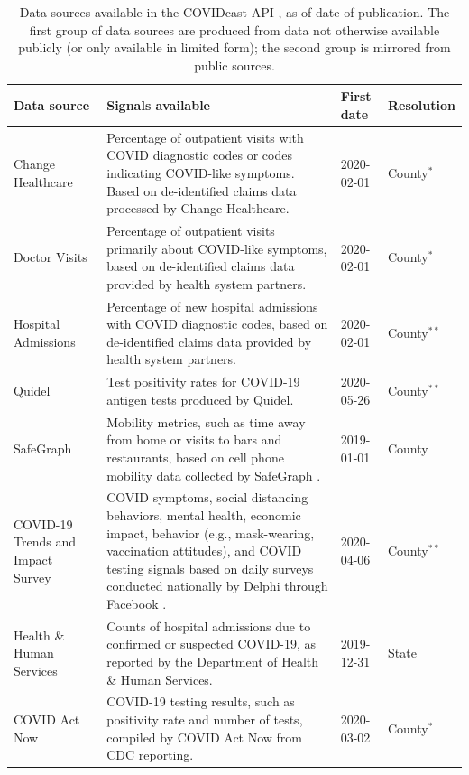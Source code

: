 \documentclass[9pt,twocolumn,twoside,lineno]{pnas-new}
\begin{document}
\begin{table}[t]
\centering
\caption{Data sources available in the COVIDcast API \cite{CovidcastAPI}, as of
  date of publication. The first group of data sources are produced from data
  not otherwise available publicly (or only available in limited form); the
  second group is mirrored from public sources.}
\begin{tabular}{>{\raggedright}p{1.2in} p{4.0in} l >{\raggedright\arraybackslash}p{0.5in}}
  \toprule
  \textbf{Data source} & \textbf{Signals available} & \textbf{First date} &
\textbf{Resolution} \\\midrule
  Change Healthcare & Percentage of outpatient visits with COVID diagnostic
codes or codes indicating COVID-like symptoms. Based on de-identified claims
data processed by Change Healthcare. & 2020-02-01 & County$^*$ \\
  Doctor Visits & Percentage of outpatient visits primarily about COVID-like
symptoms, based on de-identified claims data provided by health system
partners. & 2020-02-01 & County$^*$ \\
  Hospital Admissions & Percentage of new hospital admissions with COVID
diagnostic codes, based on de-identified claims data provided by health system
partners. & 2020-02-01 & County$^{**}$\\
  Quidel & Test positivity rates for COVID-19 antigen tests produced by
Quidel. & 2020-05-26 & County$^{**}$ \\
  SafeGraph & Mobility metrics, such as time away from home or visits to bars
and restaurants, based on cell phone mobility data collected by SafeGraph
\cite{SafeGraphSocial, SafeGraphPatterns}. & 2019-01-01 & County \\
  COVID-19 Trends and Impact Survey & COVID symptoms, social distancing
behaviors, mental health, economic impact, behavior (e.g., mask-wearing,
vaccination attitudes), and COVID testing signals based on daily surveys
conducted nationally by Delphi through Facebook \cite{Salomon:2021,
Kreuter:2020}. & 2020-04-06 & County$^{**}$ \\
  \midrule
  Health \& Human Services & Counts of hospital admissions due to confirmed or
suspected COVID-19, as reported by the Department of Health \& Human Services. &
2019-12-31 & State \\
  COVID Act Now & COVID-19 testing results, such as positivity rate and number
of tests, compiled by COVID Act Now from CDC reporting. & 2020-03-02 &
County$^*$ \\

\end{tabular}
\end{table}
\end{document}
